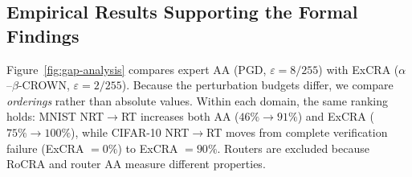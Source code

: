 \documentclass[runningheads]{llncs}
\begin{document}
\subsection{Empirical Results Supporting the Formal Findings}
\label{sec:eval-correlation}

Figure~\ref{fig:gap-analysis} compares expert AA (PGD, $\varepsilon = 8/255$) with ExCRA ($\alpha$--$\beta$-CROWN, $\varepsilon = 2/255$). Because the perturbation budgets differ, we compare \emph{orderings} rather than absolute values. Within each domain, the same ranking holds: MNIST NRT$\to$RT increases both AA ($46\% \to 91\%$) and ExCRA ($75\% \to 100\%$), while CIFAR-10 NRT$\to$RT moves from complete verification failure (ExCRA $= 0\%$) to ExCRA $= 90\%$. Routers are excluded because RoCRA and router AA measure different properties.
\end{document}
